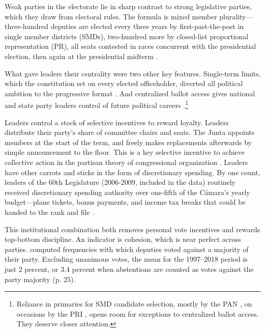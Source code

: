 \documentclass[letter,12pt]{article}
\begin{document}

Weak parties in the electorate lie in sharp contrast to strong legislative parties, which they draw from electoral rules. The formula is mixed member plurality---three-hundred deputies are elected every three years by first-past-the-post in single member districts (SMDs), two-hundred more by closed-list proportional representation (PR), all seats contested in races concurrent with the presidential election, then again at the presidential midterm \citep{weldonMixedMemberSys2001}.

What gave leaders their centrality were two other key features. Single-term limits, which the constitution set on every elected officeholder, diverted all political ambition to the progressive format \citep{schlesinger.1966}. And centralized ballot access gives national and state party leaders control of future political careers \citep{langston.2008}.\footnote{Reliance in primaries for SMD candidate selection, mostly by the PAN \citep{ascencio.kerevel.cand-sel-beh.2021}, on occasions by the PRI \citep{poire.phd.2002}, opens room for exceptions to centralized ballot access. They deserve closer attention.}

Leaders control a stock of selective incentives to reward loyalty. Leaders distribute their party's share of committee chairs and seats. The Junta appoints members at the start of the term, and freely makes replacements afterwards by simple announcement to the floor. This is a key selective incentive to achieve collective action in the partisan theory of congressional organization \citep{cox.mccubbins.1993}. Leaders have other carrots and sticks in the form of discretionary spending. By one count, leaders of the 60th Legislature (2006-2009, included in the data) routinely received discretionary spending authority over one-fifth of the Cámara's yearly budget---plane tickets, bonus payments, and income tax breaks that could be handed to the rank and file \citep{casar.2011}.

This institutional combination both removes personal vote incentives \citep{carey.shugart.1995,cain.etal.1987} and rewards top-bottom discipline. An indicator is cohesion, which is near perfect across parties. \citet{tellez-del-rio.2018} computed frequencies with which deputies voted against a majority of their party. Excluding unanimous votes, the mean for the 1997--2018 period is just 2 percent, or 3.4 percent when abstentions are counted as votes against the party majority (p. 25). 
\end{document}

